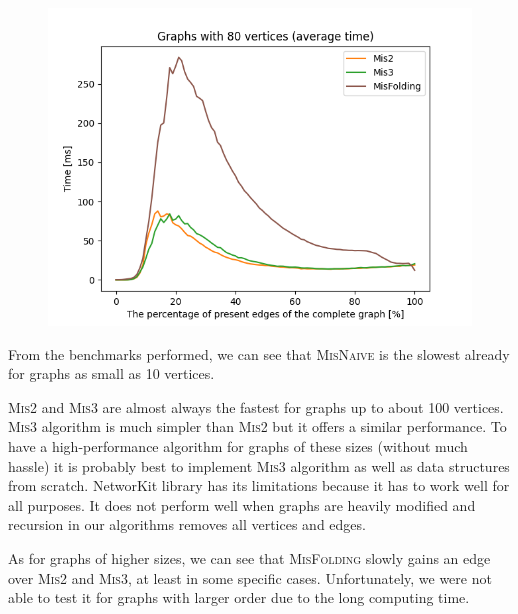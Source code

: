 \begin{figure}[H]
\includegraphics[width=\textwidth]{4_benchmark/plots/edges2.png}
\centering
\end{figure}


From the benchmarks performed, we can see that \textsc{MisNaive} is the slowest already for graphs as small as 10 vertices.

\textsc{Mis2} and \textsc{Mis3} are almost always the fastest for graphs up to about 100 vertices. \textsc{Mis3} algorithm is much simpler than \textsc{Mis2} but it offers a similar performance. To have a high-performance algorithm for graphs of these sizes (without much hassle) it is probably best to implement \textsc{Mis3} algorithm as well as data structures from scratch. NetworKit library has its limitations because it has to work well for all purposes. It does not perform well when graphs are heavily modified and recursion in our algorithms removes all vertices and edges.

As for graphs of higher sizes, we can see that \textsc{MisFolding} slowly gains an edge over \textsc{Mis2} and \textsc{Mis3}, at least in some specific cases. Unfortunately, we were not able to test it for graphs with larger order due to the long computing time.
